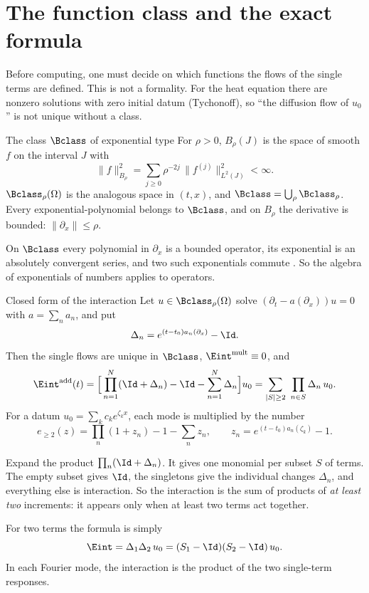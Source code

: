 \section{The function class and the exact formula}

Before computing, one must decide on which functions the flows of the single terms are defined. This is not a formality. For the heat equation there are nonzero solutions with zero initial datum (Tychonoff), so ``the diffusion flow of $u_0$'' is not unique without a class.

\begin{definition}{The class $\Bclass$ of exponential type }\label{def:B}
For $\rho>0$, $B_\rho(J)$ is the space of smooth $f$ on the interval $J$ with
\[
\|f\|_{B_\rho}^2=\sum_{j\ge0}\rho^{-2j}\,\|f^{(j)}\|_{L^2(J)}^2<\infty .
\]
$\Bclass_\rho(\Omega)$ is the analogous space in $(t,x)$, and $\Bclass=\bigcup_\rho\Bclass_\rho$. Every exponential-polynomial belongs to $\Bclass$, and on $B_\rho$ the derivative is bounded: $\|\partial_x\|\le\rho$.
\end{definition}

On $\Bclass$ every polynomial in $\partial_x$ is a bounded operator, its exponential is an absolutely convergent series, and two such exponentials commute  \proved. So the algebra of exponentials of numbers applies to operators.

\begin{theorem}{Closed form of the interaction  \proved}\label{thm:eint}
Let $u\in\Bclass_\rho(\Omega)$ solve $(\partial_t-a(\partial_x))u=0$ with $a=\sum_na_n$, and put
\[
\Delta_n=e^{(t-t_0)a_n(\partial_x)}-\Id .
\]
Then the single flows are unique in $\Bclass$, $\Eint^{\mathrm{mult}}\equiv0$, and
\begin{equation}\label{eq:eint}
\Eint^{\mathrm{add}}(t)=\Big[\prod_{n=1}^N(\Id+\Delta_n)-\Id-\sum_{n=1}^N\Delta_n\Big]u_0
=\sum_{|S|\ge2}\ \prod_{n\in S}\Delta_n\,u_0 .
\end{equation}
For a datum $u_0=\sum_kc_ke^{\zeta_kx}$, each mode is multiplied by the number
\[
e_{\ge2}(z)=\prod_n(1+z_n)-1-\sum_nz_n,\qquad z_n=e^{(t-t_0)a_n(\zeta_k)}-1 .
\]
\end{theorem}

\begin{intuition}
Expand the product $\prod_n(\Id+\Delta_n)$. It gives one monomial per subset $S$ of terms. The empty subset gives $\Id$, the singletons give the individual changes $\Delta_n$, and everything else is interaction. So the interaction is the sum of products of \emph{at least two} increments: it appears only when at least two terms act together.

For two terms the formula is simply
\[
\Eint=\Delta_1\Delta_2\,u_0=(S_1-\Id)(S_2-\Id)\,u_0 .
\]
In each Fourier mode, the interaction is the product of the two single-term responses.
\end{intuition}

